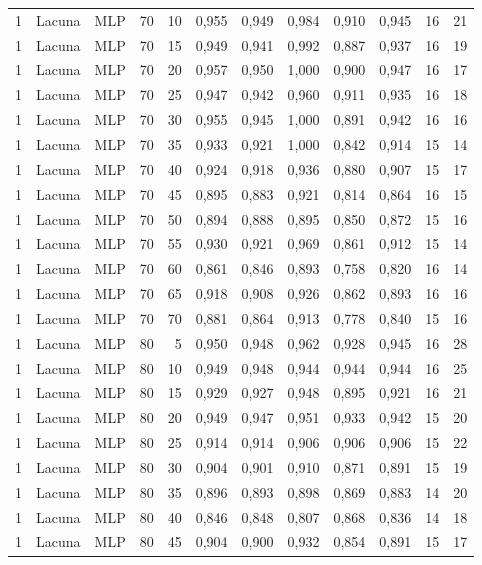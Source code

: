 \begin{longtable}{@{}rllrrrrrrrrr@{}}
1 & Lacuna & MLP & 70 & 10 & 0,955 & 0,949 & 0,984 & 0,910 & 0,945 & 16 & 21 \\
1 & Lacuna & MLP & 70 & 15 & 0,949 & 0,941 & 0,992 & 0,887 & 0,937 & 16 & 19 \\
1 & Lacuna & MLP & 70 & 20 & 0,957 & 0,950 & 1,000 & 0,900 & 0,947 & 16 & 17 \\
1 & Lacuna & MLP & 70 & 25 & 0,947 & 0,942 & 0,960 & 0,911 & 0,935 & 16 & 18 \\
1 & Lacuna & MLP & 70 & 30 & 0,955 & 0,945 & 1,000 & 0,891 & 0,942 & 16 & 16 \\
1 & Lacuna & MLP & 70 & 35 & 0,933 & 0,921 & 1,000 & 0,842 & 0,914 & 15 & 14 \\
1 & Lacuna & MLP & 70 & 40 & 0,924 & 0,918 & 0,936 & 0,880 & 0,907 & 15 & 17 \\
1 & Lacuna & MLP & 70 & 45 & 0,895 & 0,883 & 0,921 & 0,814 & 0,864 & 16 & 15 \\
1 & Lacuna & MLP & 70 & 50 & 0,894 & 0,888 & 0,895 & 0,850 & 0,872 & 15 & 16 \\
1 & Lacuna & MLP & 70 & 55 & 0,930 & 0,921 & 0,969 & 0,861 & 0,912 & 15 & 14 \\
1 & Lacuna & MLP & 70 & 60 & 0,861 & 0,846 & 0,893 & 0,758 & 0,820 & 16 & 14 \\
1 & Lacuna & MLP & 70 & 65 & 0,918 & 0,908 & 0,926 & 0,862 & 0,893 & 16 & 16 \\
1 & Lacuna & MLP & 70 & 70 & 0,881 & 0,864 & 0,913 & 0,778 & 0,840 & 15 & 16 \\
1 & Lacuna & MLP & 80 & 5 & 0,950 & 0,948 & 0,962 & 0,928 & 0,945 & 16 & 28 \\
1 & Lacuna & MLP & 80 & 10 & 0,949 & 0,948 & 0,944 & 0,944 & 0,944 & 16 & 25 \\
1 & Lacuna & MLP & 80 & 15 & 0,929 & 0,927 & 0,948 & 0,895 & 0,921 & 16 & 21 \\
1 & Lacuna & MLP & 80 & 20 & 0,949 & 0,947 & 0,951 & 0,933 & 0,942 & 15 & 20 \\
1 & Lacuna & MLP & 80 & 25 & 0,914 & 0,914 & 0,906 & 0,906 & 0,906 & 15 & 22 \\
1 & Lacuna & MLP & 80 & 30 & 0,904 & 0,901 & 0,910 & 0,871 & 0,891 & 15 & 19 \\
1 & Lacuna & MLP & 80 & 35 & 0,896 & 0,893 & 0,898 & 0,869 & 0,883 & 14 & 20 \\
1 & Lacuna & MLP & 80 & 40 & 0,846 & 0,848 & 0,807 & 0,868 & 0,836 & 14 & 18 \\
1 & Lacuna & MLP & 80 & 45 & 0,904 & 0,900 & 0,932 & 0,854 & 0,891 & 15 & 17 \\

\end{longtable}
